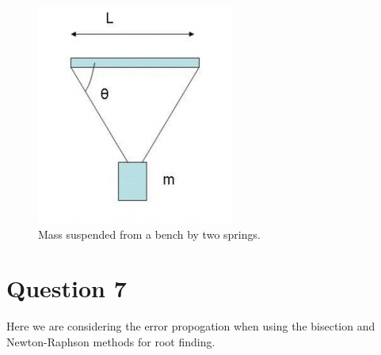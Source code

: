 \documentclass[a4paper,12pt]{UoBnote}
\begin{document}
\begin{figure}
	\centering
	\includegraphics[scale=1]{masses}
	\caption{Mass suspended from a bench by two springs.}
	\label{fig:masses}
\end{figure}

\section{Question 7}

Here we are considering the error propogation when using the bisection and Newton-Raphson methods for root finding.

\printbibliography
\end{document}
